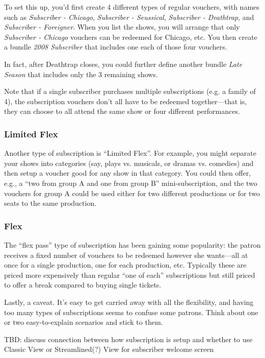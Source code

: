 To set this up, you'd first create 4 different types of regular
vouchers, with names such as  \emph{Subscriber - Chicago}, \emph{Subscriber -
Seussical}, \emph{Subscriber - Deathtrap}, and \emph{Subscriber -
Foreigner}.  When you list the shows, you will arrange that only
\emph{Subscriber - Chicago} vouchers can be redeemed for Chicago, etc.  You
then create a bundle \emph{2008 Subscriber} that includes one each of
those four vouchers.

In fact, after Deathtrap closes, you could further
define another bundle \emph{Late Season} that includes only the 3
remaining shows.

Note that if a single subscriber purchases multiple subscriptions
(e.g. a family of 4), the subscription vouchers don't all have to be
redeemed together---that is, they can choose to all attend the same show
or four different performances.

\subsubsection{Limited Flex}

Another type of subscription is ``Limited Flex''.  For example, you
might separate your shows into categories (say, plays vs. musicals, or
dramas vs. comedies) and then setup a voucher good for any show in that
category.  You could then offer, e.g., a ``two from group A and one from
group B'' mini-subscription, and the two vouchers for group A could be
used either for two different productions or for two seats to the same
production. 

\subsubsection{Flex}

The ``flex pass'' type of subscription has been gaining some popularity:
the patron receives a fixed number of vouchers to be redeemed however
she wants---all at once for a single production, one for each
production, etc.  Typically these are priced more expensively than
regular ``one of each'' subscriptions but still priced to offer a break
compared to buying single tickets.

Lastly, a caveat.  It's easy to get carried away with all the
flexibility, and having too many types of subscriptions seems to confuse
some patrons.  Think about one or two easy-to-explain scenarios and
stick to them.

TBD: discuss connection between how subscription is setup and whether to
use Classic View or Streamlined(?) View for subscriber welcome screen


